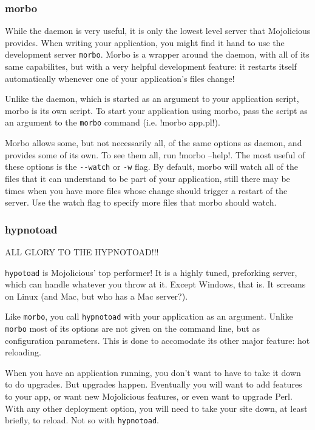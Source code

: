 \subsubsection{morbo}

While the daemon is very useful, it is only the lowest level server that Mojolicious provides.
When writing your application, you might find it hand to use the development server \verb!morbo!.
Morbo is a wrapper around the daemon, with all of its same capabilites, but with a very helpful development feature:
it restarts itself automatically whenever one of your application's files change!

Unlike the daemon, which is started as an argument to your application script, morbo is its own script.
To start your application using morbo, pass the script as an argument to the \verb!morbo! command (i.e. \lstbash!morbo app.pl!).

Morbo allows some, but not necessarily all, of the same options as daemon, and provides some of its own.
To see them all, run \lstbash!morbo --help!.
The most useful of these options is the \verb!--watch! or \verb!-w! flag.
By default, morbo will watch all of the files that it can understand to be part of your application,
still there may be times when you have more files whose change should trigger a restart of the server.
Use the watch flag to specify more files that morbo should watch.

\subsubsection{hypnotoad}

ALL GLORY TO THE HYPNOTOAD!!!

\verb!hypotoad! is Mojolicious' top performer!
It is a highly tuned, preforking server, which can handle whatever you throw at it.
Except Windows, that is.
It screams on Linux (and Mac, but who has a Mac server?).

Like \verb!morbo!, you call \verb!hypnotoad! with your application as an argument.
Unlike \verb!morbo! most of its options are not given on the command line, but as configuration parameters.
This is done to accomodate its other major feature: hot reloading.

When you have an application running, you don't want to have to take it down to do upgrades.
But upgrades happen.
Eventually you will want to add features to your app, or want new Mojolicious features, or even want to upgrade Perl.
With any other deployment option, you will need to take your site down, at least briefly, to reload.
Not so with \verb!hypnotoad!.

